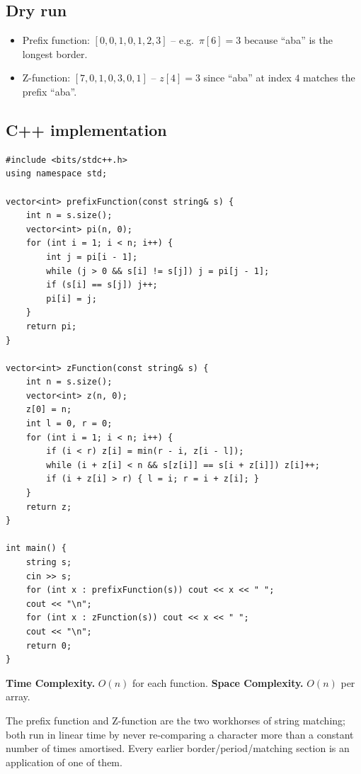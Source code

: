 \subsection*{Dry run}


\begin{itemize}
  \item Prefix function: $[0,0,1,0,1,2,3]$ -- e.g.\ $\pi[6]=3$ because
        ``aba'' is the longest border.
  \item Z-function: $[7,0,1,0,3,0,1]$ -- $z[4]=3$ since ``aba'' at index
        $4$ matches the prefix ``aba''.
\end{itemize}

\subsection*{C++ implementation}

\begin{lstlisting}
#include <bits/stdc++.h>
using namespace std;

vector<int> prefixFunction(const string& s) {
    int n = s.size();
    vector<int> pi(n, 0);
    for (int i = 1; i < n; i++) {
        int j = pi[i - 1];
        while (j > 0 && s[i] != s[j]) j = pi[j - 1];
        if (s[i] == s[j]) j++;
        pi[i] = j;
    }
    return pi;
}

vector<int> zFunction(const string& s) {
    int n = s.size();
    vector<int> z(n, 0);
    z[0] = n;
    int l = 0, r = 0;
    for (int i = 1; i < n; i++) {
        if (i < r) z[i] = min(r - i, z[i - l]);
        while (i + z[i] < n && s[z[i]] == s[i + z[i]]) z[i]++;
        if (i + z[i] > r) { l = i; r = i + z[i]; }
    }
    return z;
}

int main() {
    string s;
    cin >> s;
    for (int x : prefixFunction(s)) cout << x << " ";
    cout << "\n";
    for (int x : zFunction(s)) cout << x << " ";
    cout << "\n";
    return 0;
}
\end{lstlisting}

\begin{complexitybox}
\textbf{Time Complexity.} $O(n)$ for each function. \textbf{Space
Complexity.} $O(n)$ per array.
\end{complexitybox}

\begin{takeawaybox}
The prefix function and Z-function are the two workhorses of string
matching; both run in linear time by never re-comparing a character more
than a constant number of times amortised. Every earlier
border/period/matching section is an application of one of them.
\end{takeawaybox}
